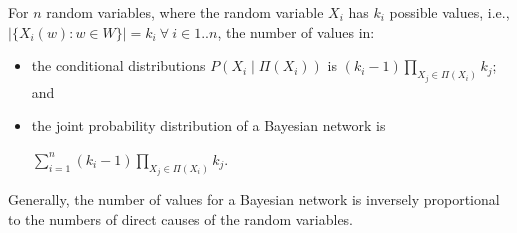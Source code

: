 For $n$ random variables, where the random variable $X_i$ has $k_i$ possible
values, i.e., $|\{ X_i(w) : w \in W \}| = k_i \ \forall\ i \in 1 .. n$, the
number of values in:
\begin{itemize}
  \item the conditional distributions $P(X_i \mid \Pi(X_i))$ is
        $(k_i - 1) \prod_{X_j \in \Pi(X_i)} k_j$; and
  \item the joint probability distribution of a Bayesian network is

        $\sum_{i = 1}^{n} (k_i - 1) \prod_{X_j \in \Pi(X_i)} k_j$.
\end{itemize}

Generally, the number of values for a Bayesian network is inversely proportional
to the numbers of direct causes of the random variables.